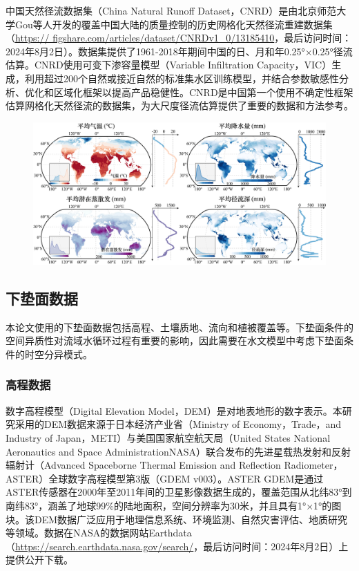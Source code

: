 中国天然径流数据集（China Natural Runoff Dataset，CNRD）是由北京师范大学Gou等\cite{gouCNRDV1HighQuality2021, gouSensitivityAnalysisBased2020, gouSeasonalityImpactFactor2022, GouJiaoJiaoJiYuVICDeZhongGuoTianRanJingLiuGuSuanYuPingJie2021}人开发的覆盖中国大陆的质量控制的历史网格化天然径流重建数据集（\href{https://figshare.com/articles/dataset/CNRDv1_0/13185410}{https:// figshare.com/articles/dataset/CNRDv1\_0/13185410}，最后访问时间：2024年8月2日）。数据集提供了1961-2018年期间中国的日、月和年0.25°×0.25°径流估算。CNRD使用可变下渗容量模型（Variable Infiltration Capacity，VIC）生成，利用超过200个自然或接近自然的标准集水区训练模型，并结合参数敏感性分析、优化和区域化框架以提高产品稳健性。CNRD是中国第一个使用不确定性框架估算网格化天然径流的数据集，为大尺度径流估算提供了重要的数据和方法参考。\par

\begin{figure}[H]
	\centering
	\includegraphics[width=1\textwidth]{figures/chap2/Global_Ave_Climatic.jpg}
	\label{fig:Global_Climatic_Data}
\end{figure}

\subsection{下垫面数据}

本论文使用的下垫面数据包括高程、土壤质地、流向和植被覆盖等。下垫面条件的空间异质性对流域水循环过程有重要的影响，因此需要在水文模型中考虑下垫面条件的时空分异模式。

\subsubsection{高程数据}

数字高程模型（Digital Elevation Model，DEM）是对地表地形的数字表示。本研究采用的DEM数据来源于日本经济产业省（Ministry of Economy，Trade，and Industry of Japan，METI）与美国国家航空航天局（United States National Aeronautics and Space AdministrationNASA）联合发布的先进星载热发射和反射辐射计（Advanced Spaceborne Thermal Emission and Reflection Radiometer，ASTER）全球数字高程模型第3版（GDEM v003）。ASTER GDEM是通过ASTER传感器在2000年至2011年间的卫星影像数据生成的，覆盖范围从北纬83°到南纬83°，涵盖了地球99\%的陆地面积，空间分辨率为30米，并且具有1°×1°的图块。该DEM数据广泛应用于地理信息系统、环境监测、自然灾害评估、地质研究等领域。数据在NASA的数据网站Earthdata（\href{https://search.earthdata.nasa.gov/search/}{https://search.earthdata.nasa.gov/search/}，最后访问时间：2024年8月2日）上提供公开下载。

